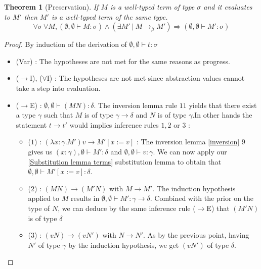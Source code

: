 \documentclass{article}
\newtheorem{theorem}{Theorem}[section]
\begin{document}
    \begin{theorem}[Preservation]
    If $M$ is a well-typed term of type $\sigma$ and it evaluates to $M'$ then $M'$ is a well-typed term of the same type.
    $$\forall\sigma\ \forall M, (\emptyset,\emptyset\vdash M : \sigma) \wedge (\exists M' \ | \  M\rightarrow_\beta M') \Rightarrow (\emptyset,\emptyset\vdash M' : \sigma)$$
    \end{theorem}
    \begin{proof}
        By induction of the derivation of $\emptyset,\emptyset\vdash t : \sigma$
        \begin{itemize}
            \item (Var) : The hypotheses are not met for the same reasons as progress. 
            
            \item ($\rightarrow$I), ($\forall$I) : The hypotheses are not met since abstraction values cannot take a step into evaluation.
            
            \item ($ \rightarrow$E) : $ \emptyset,\emptyset\vdash (M N) : \delta $. The inversion lemma rule $11$ yields that there exist a type $\gamma$ such that $M$ is of type $\gamma\rightarrow\delta$ and $N$ is of type $\gamma$.In other hands the statement $t\rightarrow t'$ would implies inference rules $1,2$ or $3$ :
            \begin{itemize}
                \item ($1$) : $(\lambda x : \gamma.M') v \rightarrow M'[x:=v]$ : The inversion lemma \ref{inversion} $9$ gives us $(x:\gamma),\emptyset\vdash M' : \delta$ and $\emptyset,\emptyset\vdash v : \gamma$. We can now apply our \ref{Substitution lemma terms} substitution lemma to obtain that $\emptyset,\emptyset\vdash M'[x:=v] : \delta$.

                \item ($2$) : $(M N) \rightarrow (M' N)$ with $M \rightarrow M'$. The induction hypothesis applied to $M$ results in $\emptyset,\emptyset\vdash M' : \gamma\rightarrow\delta$. Combined with the prior on the type of $N$, we can deduce by the same inference rule ($\rightarrow $E) that $(M' N)$ is of type $\delta$

                \item ($3$) : $(v N)\rightarrow (v N') $ with $N\rightarrow N'$. As by the previous point, having $N'$ of type $\gamma$ by the induction hypothesis, we get $(v N')$ of type $\delta$.
            \end{itemize}


\end{itemize}
\end{proof}
\end{document}
